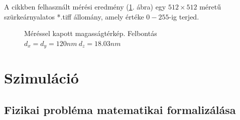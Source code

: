 	A cikkben felhasznált mérési eredmény (\ref{fig:felulet}. ábra) egy
	$512\times512$ méretű szürkeárnyalatos *.tiff állomány, amely értéke $0-255$-ig terjed.
	
	\begin{figure}[!t]
		\centering
		\hfil
		\caption{\scriptsize Méréssel kapott magasságtérkép. Felbontás $d_x=d_y=120nm \ d_z=18.03nm$}
		\label{fig:felulet}
	\end{figure}
	
	
	
\section{Szimuláció}
\subsection{Fizikai probléma matematikai formalizálása}
	

